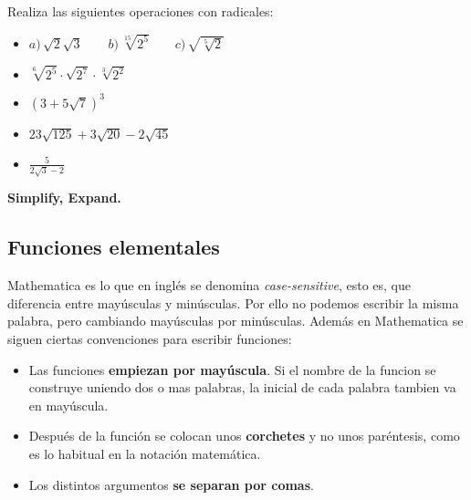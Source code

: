 \documentclass[a4paper,10pt, draft]{article}
\newenvironment{capitulo}{\begin{tcolorbox}[colback=red!5!white,colframe=red!75!black]}{\end{tcolorbox}\bigskip}
\newenvironment{ejer}{\begin{tcolorbox}[center title, title=Ejercicios,
fonttitle=\sffamily\bfseries,colback=blue!5,colframe=orange]}{\end{tcolorbox}}
\newenvironment{funciones}{\begin{tcolorbox}[center title, title=Nuevas funciones, fonttitle=\sffamily\bfseries, colback=green!5!white,colframe=red!75!black]}{\end{tcolorbox}\bigskip}
\begin{document}
\begin{ejer}

Realiza las siguientes operaciones con radicales:

\begin{itemize}


\item  $a)\,\sqrt{2}\sqrt{3} \qquad b)\,\sqrt[15]{2^5}\qquad c)\, \sqrt{\sqrt[5]{2}}$


\item  $\sqrt[6]{2^5} \cdot \sqrt{2^7} \cdot \sqrt[3]{2^2}$


\item $\left(3+5\sqrt{7}\right)^3$


\item  $ 23\sqrt{125} + 3\sqrt{20}-2\sqrt{45}$


\item  $ \displaystyle \frac{5}{2\sqrt{3}-2}$

\end{itemize}

\end{ejer}


\begin{funciones}

\textbf{Simplify, Expand.}


\end{funciones}



\newpage

\begin{capitulo}

\section{Funciones elementales}


\end{capitulo}

Mathematica es lo que en inglés se denomina \textit{case-sensitive}, esto es, que diferencia entre mayúsculas y minúsculas. Por ello no podemos escribir la misma palabra, pero cambiando mayúsculas por minúsculas. Además en Mathematica
se siguen ciertas convenciones para escribir funciones:

\begin{itemize}

\item Las funciones \textbf{empiezan por mayúscula}. Si el nombre de la funcion se construye uniendo dos o mas palabras, la inicial de cada palabra tambien va en mayúscula.

\item Después de la función se colocan unos \textbf{corchetes} y no unos paréntesis, como es lo habitual en la notación matemática.

\item Los distintos argumentos \textbf{se separan por comas}.

\end{itemize}
\end{document}
